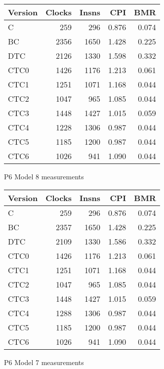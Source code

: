 \documentclass[10pt,a4paper]{article}
\begin{document}
\begin{figure}[htb]
\begin{center}
\begin{tabular}{|@{~}l|r|r|r|r|}
\hline
Version & Clocks & Insns & CPI & BMR \\
\hline
C    &  259 &  296 & 0.876 & 0.074 \\
BC   & 2356 & 1650 & 1.428 & 0.225 \\
DTC  & 2126 & 1330 & 1.598 & 0.332 \\
CTC0 & 1426 & 1176 & 1.213 & 0.061 \\
CTC1 & 1251 & 1071 & 1.168 & 0.044 \\
CTC2 & 1047 &  965 & 1.085 & 0.044 \\
CTC3 & 1448 & 1427 & 1.015 & 0.059 \\
CTC4 & 1228 & 1306 & 0.987 & 0.044 \\
CTC5 & 1185 & 1200 & 0.987 & 0.044 \\
CTC6 & 1026 &  941 & 1.090 & 0.044 \\
\hline
\end{tabular}
\end{center}
\caption{P6 Model 8 measurements}
\label{fig:measurements-p6m8}
\end{figure}

\begin{figure}[htb]
\begin{center}
\begin{tabular}{|@{~}l|r|r|r|r|}
\hline
Version & Clocks & Insns & CPI & BMR \\
\hline
C    &  259 &  296 & 0.876 & 0.074 \\
BC   & 2357 & 1650 & 1.428 & 0.225 \\
DTC  & 2109 & 1330 & 1.586 & 0.332 \\
CTC0 & 1426 & 1176 & 1.213 & 0.061 \\
CTC1 & 1251 & 1071 & 1.168 & 0.044 \\
CTC2 & 1047 &  965 & 1.085 & 0.044 \\
CTC3 & 1448 & 1427 & 1.015 & 0.059 \\
CTC4 & 1288 & 1306 & 0.987 & 0.044 \\
CTC5 & 1185 & 1200 & 0.987 & 0.044 \\
CTC6 & 1026 &  941 & 1.090 & 0.044 \\
\hline
\end{tabular}
\end{center}
\caption{P6 Model 7 measurements}
\label{fig:measurements-p6m7}
\end{figure}
\end{document}
